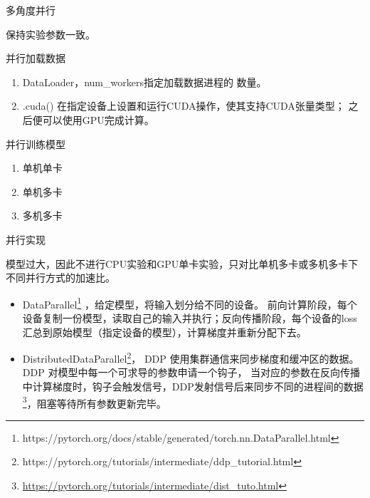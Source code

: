 \documentclass[algorithm,pgfplots]{cuzbeamer}
\begin{document}
    \begin{frame}{多角度并行}
        \begin{leftbar}
            保持实验参数一致。
        \end{leftbar}
        \begin{block}{并行加载数据}
            \begin{enumerate}
                \item {\ttfamily DataLoader}，{\ttfamily num\_workers}指定加载数据进程的
                数量。
                \item {\ttfamily .cuda()} 在指定设备上设置和运行CUDA操作，使其支持CUDA张量类型；
                之后便可以使用GPU完成计算。
            \end{enumerate}
        \end{block}

        \begin{block}{并行训练模型}
            \begin{enumerate}
                \item 单机单卡
                \item 单机多卡
                \item 多机多卡
            \end{enumerate}
        \end{block}
    \end{frame}

    \begin{frame}{并行实现}
        \begin{leftbar}
            模型过大，因此不进行CPU实验和GPU单卡实验，只对比单机多卡或多机多卡下不同并行方式的加速比。
        \end{leftbar}
        \begin{block}{ }
            \begin{itemize}
                \item {\ttfamily DataParallel\footnote{\ttfamily https://pytorch.org/docs/stable/generated/torch.nn.DataParallel.html}}
                ，给定模型，将输入划分给不同的设备。
                前向计算阶段，每个设备复制一份模型，读取自己的输入并执行；反向传播阶段，每个设备的loss汇总到原始模型（指定设备的模型），计算梯度并重新分配下去。
                \item {\ttfamily DistributedDataParallel\footnote{\ttfamily https://pytorch.org/tutorials/intermediate/ddp\_tutorial.html}}，
                DDP 使用集群通信来同步梯度和缓冲区的数据。DDP 对模型中每一个可求导的参数申请一个钩子，
                当对应的参数在反向传播中计算梯度时，钩子会触发信号，DDP发射信号后来同步不同的进程间的数据\footnote{\ttfamily \url{https://pytorch.org/tutorials/intermediate/dist_tuto.html}}，阻塞等待所有参数更新完毕。
            \end{itemize}
        \end{block}
    \end{frame}
\end{document}
